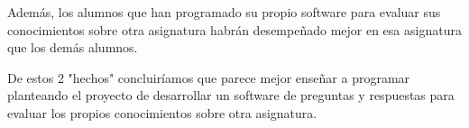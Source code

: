 \documentclass[palatino,miniheader]{apuntesURJC}
\begin{document}
Además, los alumnos que han programado su propio software para evaluar sus conocimientos sobre otra asignatura habrán desempeñado mejor en esa asignatura que los demás alumnos.

De estos 2 "hechos" concluiríamos que parece mejor enseñar a programar planteando el proyecto de desarrollar un software de preguntas y respuestas para evaluar los propios conocimientos sobre otra asignatura.




\label{bibliografia}

\end{document}
